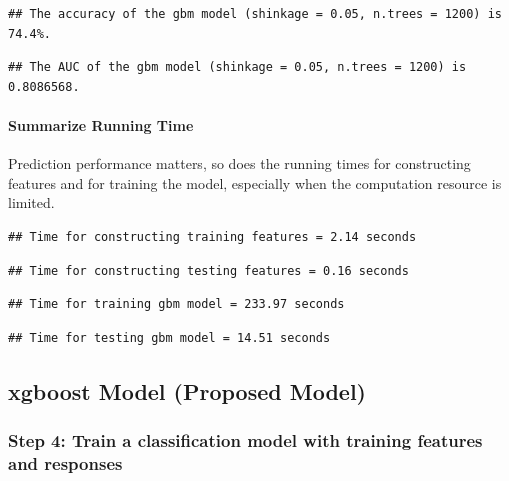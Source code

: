 \documentclass[
]{article}
\begin{document}
\begin{verbatim}
## The accuracy of the gbm model (shinkage = 0.05, n.trees = 1200) is 74.4%.
\end{verbatim}

\begin{verbatim}
## The AUC of the gbm model (shinkage = 0.05, n.trees = 1200) is 0.8086568.
\end{verbatim}

\hypertarget{summarize-running-time}{%
\paragraph{Summarize Running Time}\label{summarize-running-time}}

Prediction performance matters, so does the running times for
constructing features and for training the model, especially when the
computation resource is limited.

\begin{verbatim}
## Time for constructing training features = 2.14 seconds
\end{verbatim}

\begin{verbatim}
## Time for constructing testing features = 0.16 seconds
\end{verbatim}

\begin{verbatim}
## Time for training gbm model = 233.97 seconds
\end{verbatim}

\begin{verbatim}
## Time for testing gbm model = 14.51 seconds
\end{verbatim}

\newpage

\hypertarget{xgboost-model-proposed-model}{%
\subsection{xgboost Model (Proposed
Model)}\label{xgboost-model-proposed-model}}

\hypertarget{step-4-train-a-classification-model-with-training-features-and-responses-1}{%
\subsubsection{Step 4: Train a classification model with training
features and
responses}\label{step-4-train-a-classification-model-with-training-features-and-responses-1}}
\end{document}
